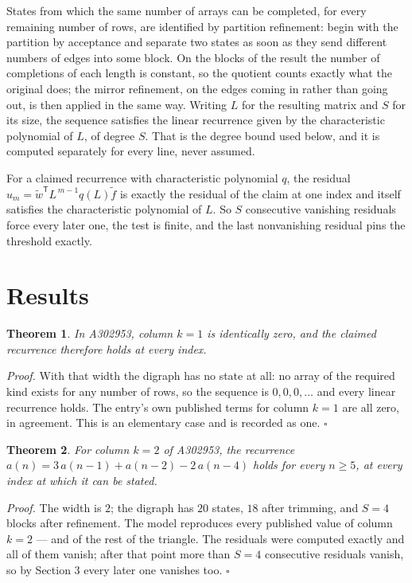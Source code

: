 \documentclass[11pt]{article}
\newtheorem{theorem}{Theorem}
\theoremstyle{definition}
\begin{document}
States from which the same number of arrays can be completed, for every remaining number of rows, are identified by partition refinement: begin with the partition by acceptance and separate two states as soon as they send different numbers of edges into some block. On the blocks of the result the number of completions of each length is constant, so the quotient counts exactly what the original does; the mirror refinement, on the edges coming in rather than going out, is then applied in the same way. Writing $L$ for the resulting matrix and $S$ for its size, the sequence satisfies the linear recurrence given by the characteristic polynomial of $L$, of degree $S$. That is the degree bound used below, and it is computed separately for every line, never assumed.

For a claimed recurrence with characteristic polynomial $q$, the residual $u_m = \tilde w^{\mathsf T}L^{\,m-1}q(L)\tilde f$ is exactly the residual of the claim at one index and itself satisfies the characteristic polynomial of $L$. So $S$ consecutive vanishing residuals force every later one, the test is finite, and the last nonvanishing residual pins the threshold exactly.

\section{Results}

\begin{theorem} In A302953, column $k = 1$ is identically zero, and the claimed recurrence therefore holds at every index.\end{theorem}

{\itshape Proof.} With that width the digraph has no state at all: no array of the required kind exists for any number of rows, so the sequence is $0,0,0,\dots$ and every linear recurrence holds. The entry's own published terms for column $k = 1$ are all zero, in agreement. This is an elementary case and is recorded as one. $\square$

\begin{theorem} For column $k = 2$ of A302953, the recurrence $a(n) = 3\,a(n-1) + a(n-2) - 2\,a(n-4)$ holds for every $n \ge 5$, at every index at which it can be stated.\end{theorem}

{\itshape Proof.} The width is $2$; the digraph has $20$ states, $18$ after trimming, and $S = 4$ blocks after refinement. The model reproduces every published value of column $k = 2$ --- and of the rest of the triangle. The residuals were computed exactly and all of them vanish; after that point more than $S = 4$ consecutive residuals vanish, so by Section 3 every later one vanishes too. $\square$
\end{document}

